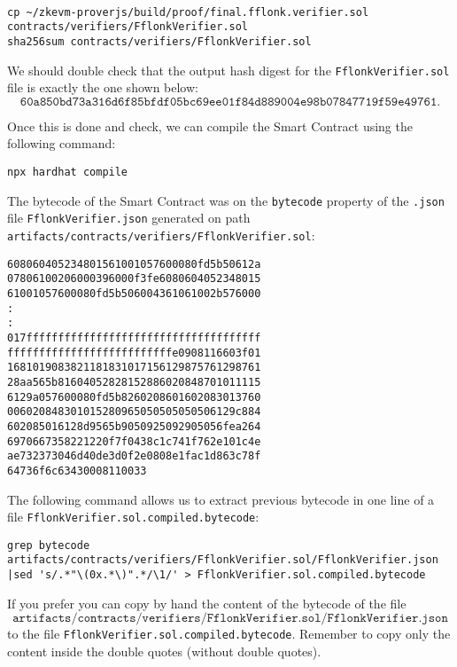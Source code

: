 \begin{lstlisting}[style=termt]

cp ~/zkevm-proverjs/build/proof/final.fflonk.verifier.sol contracts/verifiers/FflonkVerifier.sol
sha256sum contracts/verifiers/FflonkVerifier.sol
\end{lstlisting}

We should double check that the output hash digest for the \texttt{FflonkVerifier.sol} file is exactly the one shown below:
\[
\texttt{60a850bd73a316d6f85bfdf05bc69ee01f84d889004e98b07847719f59e49761.}
\]

Once this is done and check, we can compile the Smart Contract using the following command:

\begin{lstlisting}[style=termt]
npx hardhat compile
\end{lstlisting}

The bytecode of the Smart Contract was on the \texttt{bytecode} property of the \texttt{.json} file \texttt{FflonkVerifier.json} generated on path \texttt{artifacts/contracts/verifiers/FflonkVerifier.sol}:

\begin{lstlisting}[style=termt]
608060405234801561001057600080fd5b50612a
07806100206000396000f3fe6080604052348015
61001057600080fd5b506004361061002b576000
:
:
017fffffffffffffffffffffffffffffffffffff
ffffffffffffffffffffffffffe0908116603f01
1681019083821181831017156129875761298761
28aa565b81604052828152886020848701011115
6129a057600080fd5b8260208601602083013760
006020848301015280965050505050506129c884
602085016128d9565b9050925092905056fea264
6970667358221220f7f0438c1c741f762e101c4e
ae732373046d40de3d0f2e0808e1fac1d863c78f
64736f6c63430008110033
\end{lstlisting}

The following command allows us to extract previous bytecode in one line of a file \texttt{FflonkVerifier.sol.compiled.bytecode}:

\begin{lstlisting}[style=termt]
grep bytecode artifacts/contracts/verifiers/FflonkVerifier.sol/FflonkVerifier.json |sed 's/.*"\(0x.*\)".*/\1/' > FflonkVerifier.sol.compiled.bytecode
\end{lstlisting}

If you prefer you can copy by hand the content of the bytecode of the file
\[
\texttt{artifacts/contracts/verifiers/FflonkVerifier.sol/FflonkVerifier.json}
\]
to the file \texttt{FflonkVerifier.sol.compiled.bytecode}. Remember to copy only the content inside the double quotes (without double quotes).

